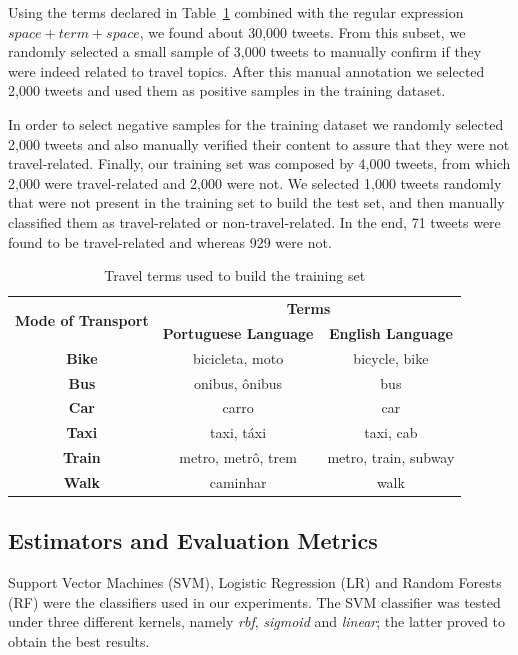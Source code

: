 Using the terms declared in Table~\ref{tab:terms} combined with the regular expression $space + term + space$, we found about 30,000 tweets. From this subset, we randomly selected a small sample of 3,000 tweets to manually confirm if they were indeed related to travel topics. After this manual annotation we selected 2,000 tweets and used them as positive samples in the training dataset.

In order to select negative samples for the training dataset we randomly selected 2,000 tweets and also manually verified their content to assure that they were not travel-related. Finally, our training set was composed by 4,000 tweets, from which 2,000 were travel-related and 2,000 were not. 
We selected 1,000 tweets randomly that were not present in the training set to build the test set, and then manually classified them as travel-related or non-travel-related. In the end, 71 tweets were found to be travel-related and whereas 929 were not.

\begin{table}[htbp]
	\centering
	\small
	\caption{Travel terms used to build the training set}
	\label{tab:terms}
	\begin{tabular}{c|c|c}
		\hline
		\multirow{2}{*}{\textbf{Mode of Transport}} & \multicolumn{2}{c|}{\textbf{Terms}} \\ \cline{2-3} 
		& \multicolumn{1}{l|}{\textbf{Portuguese Language}} & \textbf{English Language} \\ \hline
		\textbf{Bike} & bicicleta, moto & bicycle, bike \\
		\textbf{Bus} & onibus, ônibus & bus \\
		\textbf{Car} & carro & car \\
		\textbf{Taxi} & taxi, táxi & taxi, cab \\
		\textbf{Train} & metro, metrô, trem & metro, train, subway \\
		\textbf{Walk} & caminhar & walk \\ \hline
	\end{tabular}
\end{table}

\subsection{Estimators and Evaluation Metrics}
Support Vector Machines (SVM), Logistic Regression (LR) and Random Forests (RF) were the classifiers used in our experiments. The SVM classifier was tested under three different kernels, namely \textit{rbf}, \textit{sigmoid} and \textit{linear}; the latter proved to obtain the best results. 

